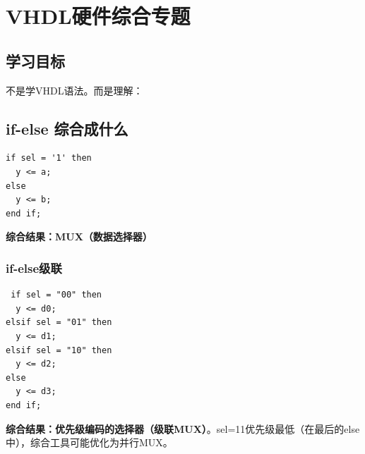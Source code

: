 \chapter{VHDL硬件综合专题}

\section{学习目标}

不是学VHDL语法。而是理解：

\begin{center}
\end{center}

\section{if-else 综合成什么}

\begin{lstlisting}[caption={if-else示例}]
 if sel = '1' then
  y <= a;
else
  y <= b;
end if;
\end{lstlisting}

\textbf{综合结果：MUX（数据选择器）}

\begin{center}
\end{center}

\subsection{if-else级联}

\begin{lstlisting}
 if sel = "00" then
  y <= d0;
elsif sel = "01" then
  y <= d1;
elsif sel = "10" then
  y <= d2;
else
  y <= d3;
end if;
\end{lstlisting}

\textbf{综合结果：优先级编码的选择器（级联MUX）}。sel=11优先级最低（在最后的else中），综合工具可能优化为并行MUX。

